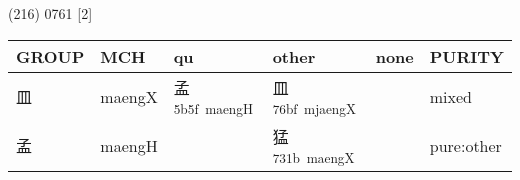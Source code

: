 \documentclass[14pt,a4paper]{scrartcl}
\begin{document}
(216) 0761 {[}2{]}

\begin{longtable}[c]{@{}llllll@{}}
\toprule
\begin{minipage}[b]{0.14\columnwidth}\raggedright\strut
GROUP
\strut\end{minipage} &
\begin{minipage}[b]{0.14\columnwidth}\raggedright\strut
MCH
\strut\end{minipage} &
\begin{minipage}[b]{0.14\columnwidth}\raggedright\strut
qu
\strut\end{minipage} &
\begin{minipage}[b]{0.14\columnwidth}\raggedright\strut
other
\strut\end{minipage} &
\begin{minipage}[b]{0.14\columnwidth}\raggedright\strut
none
\strut\end{minipage} &
\begin{minipage}[b]{0.14\columnwidth}\raggedright\strut
PURITY
\strut\end{minipage}\tabularnewline
\midrule
\endhead
\begin{minipage}[t]{0.14\columnwidth}\raggedright\strut
皿
\strut\end{minipage} &
\begin{minipage}[t]{0.14\columnwidth}\raggedright\strut
maengX
\strut\end{minipage} &
\begin{minipage}[t]{0.14\columnwidth}\raggedright\strut
孟\textsuperscript{5b5f~maengH}
\strut\end{minipage} &
\begin{minipage}[t]{0.14\columnwidth}\raggedright\strut
皿\textsuperscript{76bf~mjaengX}
\strut\end{minipage} &
\begin{minipage}[t]{0.14\columnwidth}\raggedright\strut
\strut\end{minipage} &
\begin{minipage}[t]{0.14\columnwidth}\raggedright\strut
mixed
\strut\end{minipage}\tabularnewline
\begin{minipage}[t]{0.14\columnwidth}\raggedright\strut
孟
\strut\end{minipage} &
\begin{minipage}[t]{0.14\columnwidth}\raggedright\strut
maengH
\strut\end{minipage} &
\begin{minipage}[t]{0.14\columnwidth}\raggedright\strut
\strut\end{minipage} &
\begin{minipage}[t]{0.14\columnwidth}\raggedright\strut
猛\textsuperscript{731b~maengX}
\strut\end{minipage} &
\begin{minipage}[t]{0.14\columnwidth}\raggedright\strut
\strut\end{minipage} &
\begin{minipage}[t]{0.14\columnwidth}\raggedright\strut
pure:other
\strut\end{minipage}\tabularnewline
\bottomrule
\end{longtable}
\end{document}
